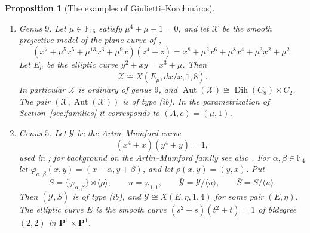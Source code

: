 \documentclass[11pt]{article}
\newtheorem{proposition}[theorem]{Proposition}
\theoremstyle{remark}
\newcommand{\Aut}{\operatorname{Aut}}
\newcommand{\Dih}{\operatorname{Dih}}
\newcommand{\F}{\mathbb F}
\begin{document}
\begin{proposition}[The examples of Giulietti--Korchm\'aros]\label{prop:sporadic-GK}
\leavevmode
\begin{enumerate}[label=\textup{(\alph*)}]
\item \emph{Genus $9$.}  Let $\mu\in\F_{16}$ satisfy $\mu^4+\mu+1=0$, and
let $\mathcal X$ be the smooth projective model of the plane curve of
\cite[Section~6.2]{GK2015},
\begin{equation}\label{eq:GK62}
 (x^7+\mu^5x^5+\mu^{13}x^3+\mu^9x)(z^4+z)
 =x^8+\mu^2x^6+\mu^8x^4+\mu^3x^2+\mu^2 .
\end{equation}
Let $E_\mu$ be the elliptic curve $y^2+xy=x^3+\mu$. Then
\[
 \mathcal X\cong X(E_\mu,dx/x,1,8).
\]
In particular $\mathcal X$ is ordinary of genus $9$, and
$\Aut(\mathcal X)\cong\Dih(C_8)\times C_2$. The pair
$(\mathcal X,\Aut(\mathcal X))$ is of type \textup{(ib)}. In the
parametrization of Section~\ref{sec:families} it corresponds to
$(A,c)=(\mu,1)$.

\item \emph{Genus $5$.}  Let $\mathcal Y$ be the Artin--Mumford curve
\[
        (x^4+x)(y^4+y)=1,
\]
used in \cite[Section~6.4]{GK2015}; for background on the Artin--Mumford
family see also \cite{MontanucciZini}.  For
$\alpha,\beta\in\F_4$ let $\varphi_{\alpha,\beta}(x,y)=(x+\alpha,y+\beta)$,
and let $\rho(x,y)=(y,x)$. Put
\[
 S=\{\varphi_{\alpha,\beta}\}\rtimes\langle\rho\rangle,\qquad
 u=\varphi_{1,1},\qquad
 \bar{\mathcal Y}=\mathcal Y/\langle u\rangle,\qquad \bar S=S/\langle u\rangle .
\]
Then $(\bar{\mathcal Y},\bar S)$ is of type \textup{(ib)}, and
$\bar{\mathcal Y}\cong X(E,\eta,1,4)$ for some pair $(E,\eta)$. The
elliptic curve $E$ is the smooth curve $(s^2+s)(t^2+t)=1$ of bidegree
$(2,2)$ in $\mathbf P^1\times\mathbf P^1$.
\end{enumerate}
\end{proposition}
\end{document}
